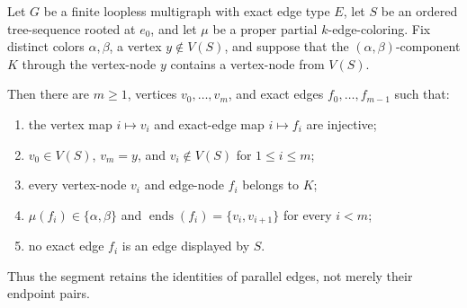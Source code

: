 \begin{helper}
Let \(G\) be a finite loopless multigraph with exact edge type \(E\), let
\(S\) be an ordered tree-sequence rooted at \(e_0\), and let \(\mu\) be a
proper partial \(k\)-edge-coloring.  Fix distinct colors
\(\alpha,\beta\), a vertex \(y\notin V(S)\), and suppose that the
\((\alpha,\beta)\)-component \(K\) through the vertex-node \(y\) contains
a vertex-node from \(V(S)\).

Then there are \(m\geq 1\), vertices
\(v_0,\ldots,v_m\), and exact edges \(f_0,\ldots,f_{m-1}\) such that:
\begin{enumerate}
\item the vertex map \(i\mapsto v_i\) and exact-edge map
      \(i\mapsto f_i\) are injective;
\item \(v_0\in V(S)\), \(v_m=y\), and
      \(v_i\notin V(S)\) for \(1\leq i\leq m\);
\item every vertex-node \(v_i\) and edge-node \(f_i\) belongs to \(K\);
\item \(\mu(f_i)\in\{\alpha,\beta\}\) and
      \(\operatorname{ends}(f_i)=\{v_i,v_{i+1}\}\) for every \(i<m\);
\item no exact edge \(f_i\) is an edge displayed by \(S\).
\end{enumerate}
Thus the segment retains the identities of parallel edges, not merely their
endpoint pairs.
\end{helper}
